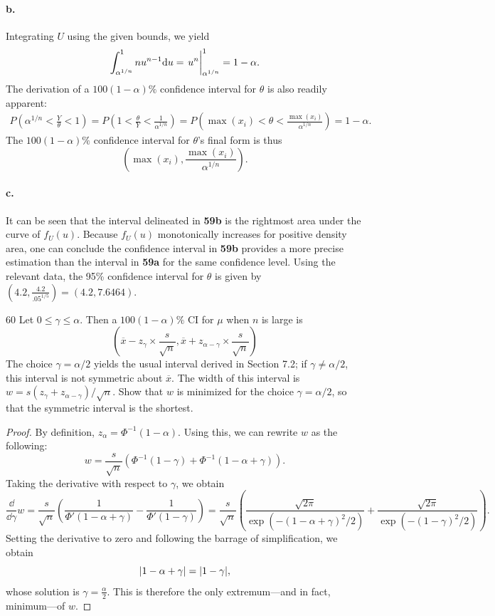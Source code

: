 \documentclass{exam}
\newcommand{\paren}[1]{\left(#1\right)}
\begin{document}
\paragraph{b.} Integrating $U$ using the given bounds, we yield
\[
	\int_{\alpha^{1/n}}^1 nu^{n - 1}\dd u = \eval{u^n}_{\alpha^{1/n}}^1 = 1 - \alpha.
\]
The derivation of a $100(1 - \alpha)\%$ confidence interval for $\theta$ is also readily apparent:
\begin{align*}
	P\paren{\alpha^{1/n} < \frac{Y}\theta < 1} = P\paren{1 < \frac{\theta}{Y} < \frac1{\alpha^{1/n}}} = P\paren{\max(x_i) < \theta < \frac{\max(x_i)}{\alpha^{1/n}}} = 1 - \alpha.
\end{align*}
The $100(1 - \alpha)\%$ confidence interval for $\theta$'s final form is thus
\[
	\paren{\max(x_i), \frac{\max(x_i)}{\alpha^{1/n}}}.
\]

\paragraph{c.} It can be seen that the interval delineated in \textbf{59b} is the rightmost area under the curve of $f_U(u)$. Because $f_U(u)$ monotonically increases for positive density area, one can conclude the confidence interval in \textbf{59b} provides a more precise estimation than the interval in \textbf{59a} for the same confidence level. Using the relevant data, the 95\% confidence interval for $\theta$ is given by $\paren{4.2, \frac{4.2}{.05^{1/5}}} = (4.2, 7.6464)$.

\begin{problem}{60}
	Let $0 \le \gamma \le \alpha$. Then a $100(1 - \alpha)\%$ CI for $\mu$ when $n$ is large is
	\[
		\paren{\overline{x} - z_{\gamma} \times \frac{s}{\sqrt{n}}, \overline{x} + z_{\alpha - \gamma} \times \frac{s}{\sqrt{n}}}
	\]
	The choice $\gamma = \alpha/2$ yields the usual interval derived in Section 7.2; if $\gamma \neq \alpha/2$, this interval is not symmetric about $\overline{x}$. The width of this interval is $w = s(z_{\gamma} + z_{\alpha - \gamma})/\sqrt{n}$. Show that $w$ is minimized for the choice $\gamma = \alpha/2$, so that the symmetric interval is the shortest.
\end{problem}
\begin{proof}
	By definition, $z_\alpha = \Phi^{-1}(1 - \alpha)$. Using this, we can rewrite $w$ as the following:
	\[
		w = \frac{s}{\sqrt{n}}(\Phi^{-1}(1 - \gamma) + \Phi^{-1}(1 - \alpha + \gamma)).
	\]
	Taking the derivative with respect to $\gamma$, we obtain
	\[
		\frac{\dd}{\dd\gamma}w = \frac{s}{\sqrt{n}}\paren{\frac{1}{\Phi'(1 - \alpha + \gamma)} - \frac1{\Phi'(1 - \gamma)}} = \frac{s}{\sqrt{n}}\paren{\frac{\sqrt{2\pi}}{\exp(-(1 - \alpha + \gamma)^2/2)} + \frac{\sqrt{2\pi}}{\exp(-(1 - \gamma)^2/2)}}.
	\]
	Setting the derivative to zero and following the barrage of simplification, we obtain
	\[
		\abs{1 - \alpha + \gamma} = \abs{1 - \gamma},
	\]
	whose solution is $\gamma = \frac\alpha2$. This is therefore the only extremum---and in fact, minimum---of $w$.
\end{proof}
\end{document}
